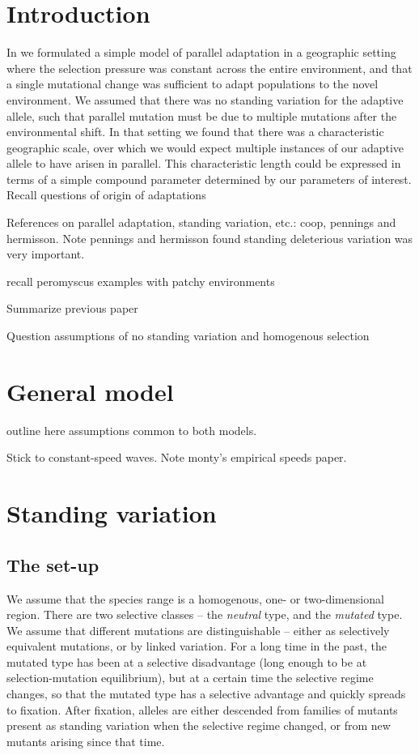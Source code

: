\documentclass{article}
\begin{document}
\section{Introduction}



In \citep{RalphCoop} we formulated a simple model of parallel adaptation in a geographic setting
where the selection pressure was constant across the entire environment, 
and that a single mutational change was sufficient to adapt populations to the novel environment. 
We assumed that there was no standing variation for the adaptive allele, such that parallel mutation must be due to multiple mutations after the environmental shift. In that setting we found that there was a characteristic geographic scale, over which we would expect multiple instances of our adaptive allele to have arisen in parallel. This characteristic length could be expressed in terms of a simple compound parameter determined by our parameters of interest.
Recall questions of origin of adaptations

References on parallel adaptation, standing variation, etc.:
  coop,
  pennings and hermisson.
Note pennings and hermisson found standing deleterious variation was very important.  

recall peromyscus examples with patchy environments

Summarize previous paper

Question assumptions of no standing variation and homogenous selection

\section{General model}

outline here assumptions common to both models.

Stick to constant-speed waves.
Note monty's empirical speeds paper.


\section{Standing variation}

\subsection{The set-up}


We assume that the species range
is a homogenous, one- or two-dimensional region. 
There are two selective classes -- the {\em neutral} type, and the {\em mutated} type.
We assume that different mutations are distinguishable --
either as selectively equivalent mutations, or by linked variation.
For a long time in the past, the mutated type has been at a selective disadvantage (long enough to be at selection-mutation equilibrium),
but at a certain time the selective regime changes, so that the mutated type has a selective advantage and quickly spreads to fixation.
After fixation, alleles are either descended
from families of mutants present as standing variation when the selective regime changed,
or from new mutants arising since that time.
\end{document}
